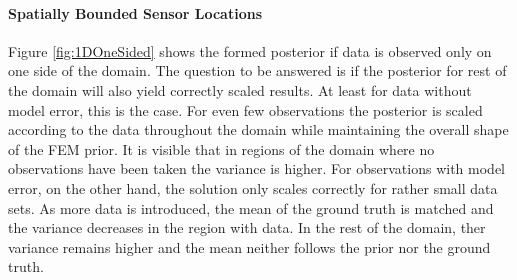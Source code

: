 \documentclass[%
  a4paper,oneside,%
  11pt,%
  smallchapters,
  style=printdev,
  extramargin,
  green,%
  rgb, <cmyk>
  ]{tubsbook}
\begin{document}
\paragraph{Spatially Bounded Sensor Locations}
Figure \ref{fig:1DOneSided} shows the formed posterior if data is observed only on one side of the domain. The question to be answered is if the posterior for rest of the domain will also yield correctly scaled results. At least for data without model error, this is the case. For even few observations the posterior is scaled according to the data throughout the domain while maintaining the overall shape of the FEM prior. It is visible that in regions of the domain where no observations have been taken the variance is higher. For observations with model error, on the other hand, the solution only scales correctly for rather small data sets. As more data is introduced, the mean of the ground truth is matched and the variance decreases in the region with data. In the rest of the domain, ther variance remains higher and the mean neither follows the prior nor the ground truth. %
%
\end{document}
